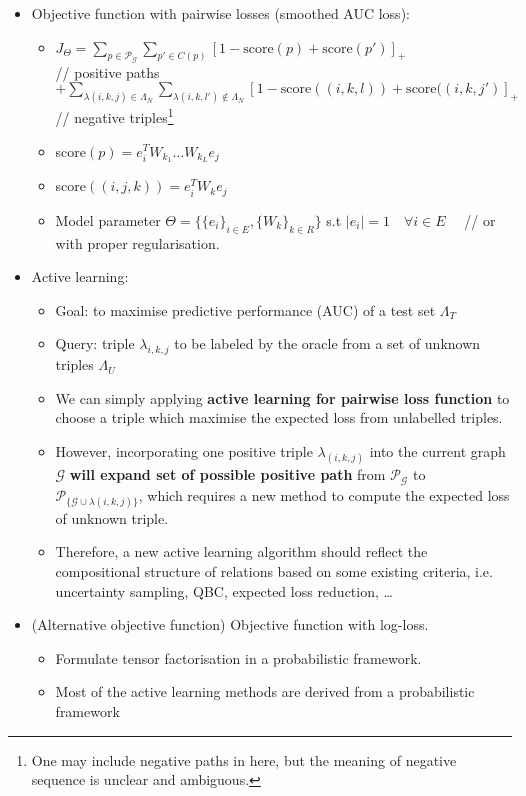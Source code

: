 \documentclass{article}
\theoremstyle{definition}
\begin{document}
\begin{itemize}
\item Objective function with pairwise losses (smoothed AUC loss)\cite{gu2015traversing}:
\begin{itemize}
\item $J_\Theta = \sum_{p\in \mathcal{P_G}} \sum_{p' \in C(p)} [1 - \text{score}(p) + \text{score}(p')]_+ \qquad\qquad\qquad\qquad\quad$ // positive paths \\
 $ + \sum_{\lambda(i,k,j) \in \Lambda_N} \sum_{\lambda(i,k,l') \notin \Lambda_N} [1 - \text{score}((i,k,l)) + \text{score}((i,k,j')]_+ \quad\quad$  // negative triples\footnote{One may include negative paths in here, but the meaning of negative sequence is unclear and ambiguous.}
\item score$(p) = e_i^T W_{k_1} \dots W_{k_L} e_j$
\item score$((i,j,k)) = e_i^T W_{k} e_j$
\item Model parameter $\Theta = \{\{e_i\}_{i \in E}, \{W_k\}_{k \in R}\}$ \quad s.t $|e_i| = 1 \quad \forall i \in E \quad$ // or with proper regularisation.
\end{itemize}

\item Active learning:
\begin{itemize}
\item Goal: to maximise predictive performance (AUC) of a test set $\Lambda_T$
\item Query: triple $\lambda_{i,k,j}$ to be labeled by the oracle from a set of unknown triples $\Lambda_U$
\item We can simply applying \textbf{active learning for pairwise loss function}\cite{Donmez2008} to choose a triple which maximise the expected loss from unlabelled triples.
\item However, incorporating one positive triple $\lambda_{(i,k,j)}$ into the current graph $\mathcal{G}$ \textbf{will expand set of possible positive path} from $\mathcal{P}_\mathcal{G}$ to $\mathcal{P}_{\{\mathcal{G} \cup \lambda{(i,k,j)}\}}$, which requires a new method to compute the expected loss of unknown triple.
\item Therefore, a new active learning algorithm should reflect the compositional structure of relations based on some existing criteria, i.e. uncertainty sampling, QBC, expected loss reduction, \dots
\end{itemize}


\item (Alternative objective function) Objective function with log-loss\cite{nickel2013logistic}.
\begin{itemize}
\item Formulate tensor factorisation in a probabilistic framework.
\item Most of the active learning methods are derived from a probabilistic framework\cite{Settles2010}
\end{itemize}


\end{itemize}
\end{document}
